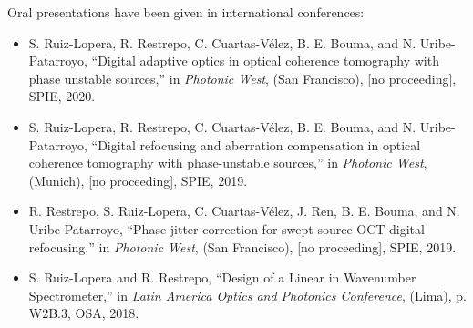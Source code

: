 Oral presentations have been given in international conferences:
\begin{itemize}
    \renewcommand{\labelitemi}{$\blacktriangleright$}
    \item S. Ruiz-Lopera, R. Restrepo, C. Cuartas-Vélez, B. E. Bouma, and N. Uribe-Patarroyo, ``Digital adaptive optics in optical coherence tomography with phase unstable sources,'' in \textit{Photonic West}, (San Francisco), [no proceeding], SPIE, 2020.

    \item S. Ruiz-Lopera, R. Restrepo, C. Cuartas-Vélez, B. E. Bouma, and N. Uribe-Patarroyo, ``Digital refocusing and aberration compensation in optical coherence tomography with phase-unstable sources,'' in \textit{Photonic West}, (Munich), [no proceeding], SPIE, 2019.
    
    \item R. Restrepo, S. Ruiz-Lopera, C. Cuartas-Vélez, J. Ren, B. E. Bouma, and N. Uribe-Patarroyo, ``Phase-jitter correction for swept-source OCT digital refocusing,'' in \textit{Photonic West}, (San Francisco), [no proceeding], SPIE, 2019.
    
    \item S. Ruiz-Lopera and R. Restrepo, ``Design of a Linear in Wavenumber Spectrometer,'' in \textit{Latin America Optics and Photonics Conference}, (Lima), p. W2B.3, OSA, 2018.
\end{itemize}